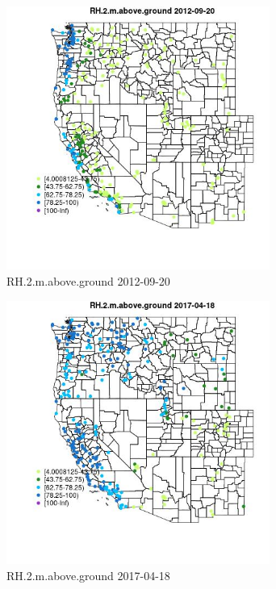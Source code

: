 \begin{figure} 
\centering  
\includegraphics[width=0.77\textwidth]{Code_Outputs/Report_ML_input_PM25_Step4_part_e_de_duplicated_aves_compiled_2019-05-14wNAs_MapObsRH2maboveground2012-09-20.jpg} 
\caption{\label{fig:Report_ML_input_PM25_Step4_part_e_de_duplicated_aves_compiled_2019-05-14wNAsMapObsRH2maboveground2012-09-20}RH.2.m.above.ground 2012-09-20} 
\end{figure} 
 

\begin{figure} 
\centering  
\includegraphics[width=0.77\textwidth]{Code_Outputs/Report_ML_input_PM25_Step4_part_e_de_duplicated_aves_compiled_2019-05-14wNAs_MapObsRH2maboveground2017-04-18.jpg} 
\caption{\label{fig:Report_ML_input_PM25_Step4_part_e_de_duplicated_aves_compiled_2019-05-14wNAsMapObsRH2maboveground2017-04-18}RH.2.m.above.ground 2017-04-18} 
\end{figure} 
 

